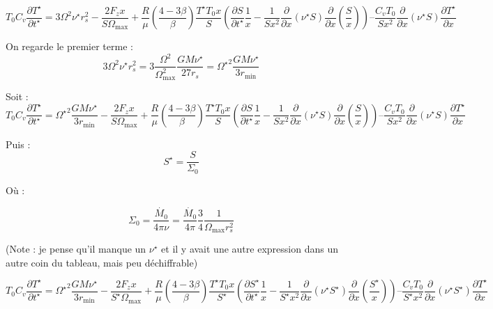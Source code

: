 \begin{equation}
    T_0 C_v \frac{\partial T^{\star}}{\partial t^{\star}} =
    3 \Omega^2 \nu^\star r_s^2 − \frac{2 F_z x}{S \Omega_\mathrm{max}} +
    \frac{R}{\mu} \left(\frac{4−3\beta}{\beta}\right) \frac{T^\star T_0 x}{S}
    \left( \frac{\partial S}{\partial t^\star} \frac{1}{x} − \frac{1}{S x^2} \frac{\partial}{\partial x} \left(\nu^\star S\right) \frac{\partial}{\partial x} \left(\frac{S}{x}\right) \right) –
    \frac{C_v T_0}{S x^2} \frac{\partial}{\partial x} \left(\nu^\star S\right) \frac{\partial T^\star}{\partial x}
\end{equation}

On regarde le premier terme :
\begin{equation}
    3 \Omega^2 \nu^\star r_s^2 = 3 \frac{\Omega^2}{\Omega_\mathrm{max}^2} \frac{G M \nu^\star}{27 r_s} = {\Omega^\star}^2 \frac{G M \nu^\star}{3 r_\mathrm{min}}
\end{equation}

Soit :
\begin{equation}
    T_0 C_v \frac{\partial T^{\star}}{\partial t^{\star}} =
    {\Omega^\star}^2 \frac{G M \nu^\star}{3 r_\mathrm{min}} − \frac{2 F_z x}{S \Omega_\mathrm{max}} +
    \frac{R}{\mu} \left(\frac{4−3\beta}{\beta}\right) \frac{T^\star T_0 x}{S}
    \left( \frac{\partial S}{\partial t^\star} \frac{1}{x} − \frac{1}{S x^2} \frac{\partial}{\partial x} \left(\nu^\star S\right) \frac{\partial}{\partial x} \left(\frac{S}{x}\right) \right) –
    \frac{C_v T_0}{S x^2} \frac{\partial}{\partial x} \left(\nu^\star S\right) \frac{\partial T^\star}{\partial x}
\end{equation}

Puis :
\begin{equation}
    S^\star = \frac{S}{\Sigma_0}
\end{equation}

Où :

\begin{equation}
    \Sigma_0 = \frac{\dot{M_0}}{4 \pi \nu} = \frac{\dot{M_0}}{4 \pi} \frac{3}{4} \frac{1}{\Omega_\mathrm{max} r_s^2}
\end{equation}

(Note : je pense qu’il manque un $\nu^\star$ et il y avait une autre expression dans un autre coin du tableau, mais peu déchiffrable)

\begin{equation}
    T_0 C_v \frac{\partial T^{\star}}{\partial t^{\star}} =
    {\Omega^\star}^2 \frac{G M \nu^\star}{3 r_\mathrm{min}} − \frac{2 F_z x}{S^\star \Omega_\mathrm{max}} +
    \frac{R}{\mu} \left(\frac{4−3\beta}{\beta}\right) \frac{T^\star T_0 x}{S^\star}
    \left( \frac{\partial S^\star}{\partial t^\star} \frac{1}{x} − \frac{1}{S^\star x^2} \frac{\partial}{\partial x} \left(\nu^\star S^\star\right) \frac{\partial}{\partial x} \left(\frac{S^\star}{x}\right) \right) –
    \frac{C_v T_0}{S^\star x^2} \frac{\partial}{\partial x} \left(\nu^\star S^\star\right) \frac{\partial T^\star}{\partial x}
\end{equation}

